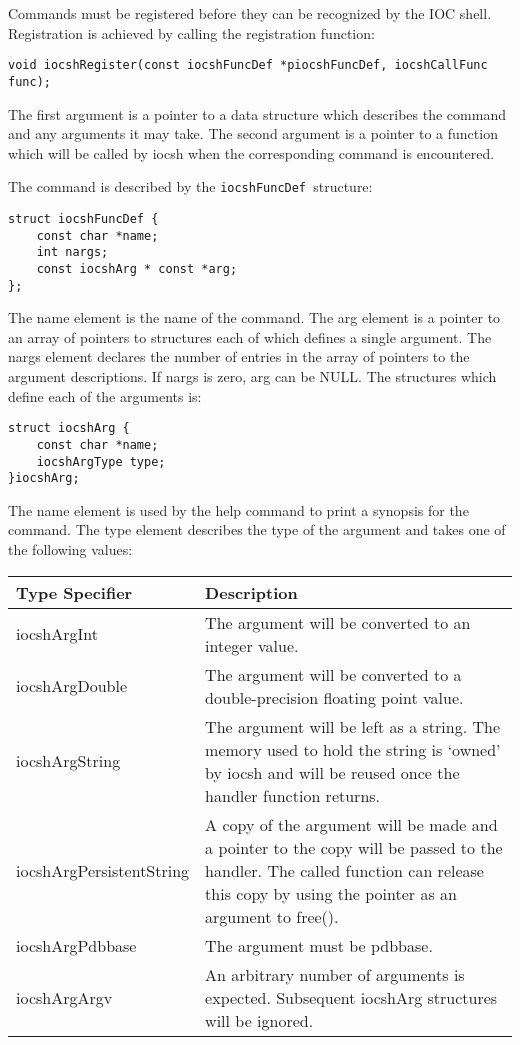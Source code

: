 Commands must be registered before they can be recognized by the IOC shell.  Registration is achieved by calling  the 
registration function:

\begin{verbatim}
void iocshRegister(const iocshFuncDef *piocshFuncDef, iocshCallFunc func);
\end{verbatim}

The first argument is a pointer to a data structure which describes the command and any arguments it may take.  The 
second argument is a pointer to a function which will be called by iocsh when the corresponding command is 
encountered.

The command is described by the  \verb|iocshFuncDef |structure:

\begin{verbatim}
struct iocshFuncDef {
    const char *name;
    int nargs;
    const iocshArg * const *arg;
};
\end{verbatim}

The name element is the name of the command.  The arg element is a pointer to an array of pointers to structures each of 
which defines a single argument.  The nargs element declares the number of entries in the array of pointers to the 
argument descriptions.  If nargs is zero, arg can be NULL.  The structures which define each of the arguments is:

\begin{verbatim}
struct iocshArg {
    const char *name;
    iocshArgType type;
}iocshArg;
\end{verbatim}

The name element is used by the help command to print a synopsis for the command.  The type element describes the type 
of the argument and takes one of the following values:

\begin{center}
\begin{longtable}
{p{1.5in}p{3.76in}}
Type Specifier & Description\\
\hline
iocshArgInt & The argument will be converted to an integer value.\\
iocshArgDouble & The argument will be converted to a double-precision floating point value.\\
iocshArgString & The argument will be left as a string.  The memory used to hold the string is `owned' by iocsh and will be reused once the handler function returns.\\
iocshArgPersistentString & A copy of the argument will be made and a pointer to the copy will be passed to the handler.  The called function can release this copy by using the pointer as an argument to free().\\
iocshArgPdbbase & The argument must be pdbbase.\\
iocshArgArgv & An arbitrary number of arguments is expected.  Subsequent iocshArg structures will be ignored.
\end{longtable}
\end{center}


